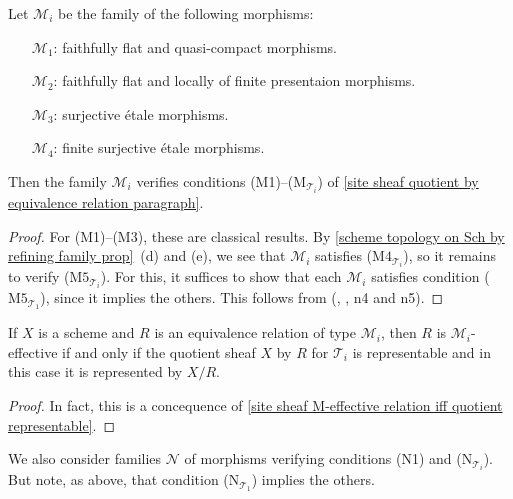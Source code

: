 \begin{proposition}\label{scheme topology T_i family M_i}
Let $\mathcal{M}_i$ be the family of the following morphisms:
\begin{enumerate}[leftmargin=35pt]
    \item[$\mathcal{M}_1$:] faithfully flat and quasi-compact morphisms.
    \item[$\mathcal{M}_2$:]  faithfully flat and locally of finite presentaion morphisms.
    \item[$\mathcal{M}_3$:]  surjective \'etale morphisms.
    \item[$\mathcal{M}_4$:]  finite surjective \'etale morphisms. 
\end{enumerate}
Then the family $\mathcal{M}_i$ verifies conditions (M1)--($\text{M}_{\mathcal{T}_i}$) of \ref{site sheaf quotient by equivalence relation paragraph}.
\end{proposition}
\begin{proof}
For (M1)--(M3), these are classical results. By \cref{scheme topology on Sch by refining family prop}~(d) and (e), we see that $\mathcal{M}_i$ satisfies ($\text{M4}_{\mathcal{T}_i}$), so it remains to verify ($\text{M5}_{\mathcal{T}_i}$). For this, it suffices to show that each $\mathcal{M}_i$ satisfies condition ($\text{M5}_{\mathcal{T}_1}$), since it implies the others. This follows from (\cite{SGA1}, , n4 and n5).
\end{proof}

\begin{corollary}\label{scheme equivalence relation M_i-effective iff quotient represent}
If $X$ is a scheme and $R$ is an equivalence relation of type $\mathcal{M}_i$, then $R$ is $\mathcal{M}_i$-effective if and only if the quotient sheaf $X$ by $R$ for $\mathcal{T}_i$ is representable and in this case it is represented by $X/R$.
\end{corollary}
\begin{proof}
In fact, this is a concequence of \cref{site sheaf M-effective relation iff quotient representable}.
\end{proof}

We also consider families $\mathcal{N}$ of morphisms verifying conditions (N1) and ($\text{N}_{\mathcal{T}_i}$). But note, as above, that condition ($\text{N}_{\mathcal{T}_1}$) implies the others.


